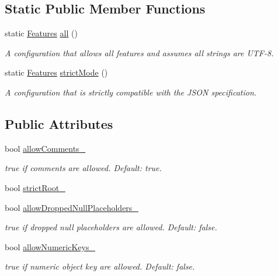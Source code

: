 \subsection*{Static Public Member Functions}
\begin{DoxyCompactItemize}
\item 
static \hyperlink{class_json_1_1_features}{Features} \hyperlink{class_json_1_1_features_a63894da6e2c100b38741fa933f3d33ae}{all} ()
\begin{DoxyCompactList}\small\item\em A configuration that allows all features and assumes all strings are U\+T\+F-\/8. \end{DoxyCompactList}\item 
static \hyperlink{class_json_1_1_features}{Features} \hyperlink{class_json_1_1_features_ae23176c14b2e79e81fb61fb1a8ab58ee}{strict\+Mode} ()
\begin{DoxyCompactList}\small\item\em A configuration that is strictly compatible with the J\+S\+ON specification. \end{DoxyCompactList}\end{DoxyCompactItemize}
\subsection*{Public Attributes}
\begin{DoxyCompactItemize}
\item 
bool \hyperlink{class_json_1_1_features_a33afd389719624b6bdb23950b3c346c9}{allow\+Comments\+\_\+}
\begin{DoxyCompactList}\small\item\em {\ttfamily true} if comments are allowed. Default\+: {\ttfamily true}. \end{DoxyCompactList}\item 
bool \hyperlink{class_json_1_1_features_a1162c37a1458adc32582b585b552f9c3}{strict\+Root\+\_\+}
\item 
bool \hyperlink{class_json_1_1_features_a5076aa72c05c7596ac339ede36c97a6a}{allow\+Dropped\+Null\+Placeholders\+\_\+}
\begin{DoxyCompactList}\small\item\em {\ttfamily true} if dropped null placeholders are allowed. Default\+: {\ttfamily false}. \end{DoxyCompactList}\item 
bool \hyperlink{class_json_1_1_features_aff3cb16b79d15d3d761b11a0dd6d4d6b}{allow\+Numeric\+Keys\+\_\+}
\begin{DoxyCompactList}\small\item\em {\ttfamily true} if numeric object key are allowed. Default\+: {\ttfamily false}. \end{DoxyCompactList}\end{DoxyCompactItemize}



